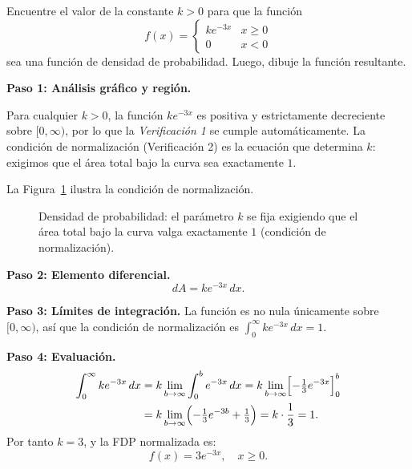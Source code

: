 \begin{example}
Encuentre el valor de la constante $k>0$ para que la función
\[
  f(x) = \begin{cases} ke^{-3x} & x\geq 0 \\ 0 & x<0 \end{cases}
\]
sea una función de densidad de probabilidad. Luego, dibuje la función resultante.
\begin{myproof}
\textbf{Paso 1: Análisis gráfico y región.}

Para cualquier $k>0$, la función $ke^{-3x}$ es positiva y estrictamente decreciente sobre
$[0,\infty)$, por lo que la \emph{Verificación 1} se cumple automáticamente. La condición de
normalización (Verificación 2) es la ecuación que determina $k$: exigimos que el área total bajo
la curva sea exactamente $1$.

La Figura~\ref{fig:densidad_normalizacion} ilustra la condición de normalización.

\begin{figure}[H]
\centering
{}
\caption{Densidad de probabilidad: el parámetro $k$ se fija exigiendo que el área total bajo la curva valga exactamente $1$ (condición de normalización).}
\label{fig:densidad_normalizacion}
\end{figure}

\textbf{Paso 2: Elemento diferencial.}
\[
  dA = ke^{-3x}\,dx.
\]

\textbf{Paso 3: Límites de integración.}
La función es no nula únicamente sobre $[0,\infty)$, así que la condición de normalización es
$\int_0^{\infty}ke^{-3x}\,dx = 1$.

\textbf{Paso 4: Evaluación.}
\begin{align*}
\int_0^{\infty} ke^{-3x}\,dx
  &= k\lim_{b\to\infty}\int_0^b e^{-3x}\,dx
   = k\lim_{b\to\infty}\Bigl[-\tfrac{1}{3}e^{-3x}\Bigr]_0^b \\
  &= k\lim_{b\to\infty}\Bigl(-\tfrac{1}{3}e^{-3b}+\tfrac{1}{3}\Bigr)
   = k\cdot\frac{1}{3} = 1.
\end{align*}
Por tanto $k=3$, y la FDP normalizada es:
\[
  \boxed{f(x)=3e^{-3x},\quad x\geq 0.}
\]
\end{myproof}
\end{example}

